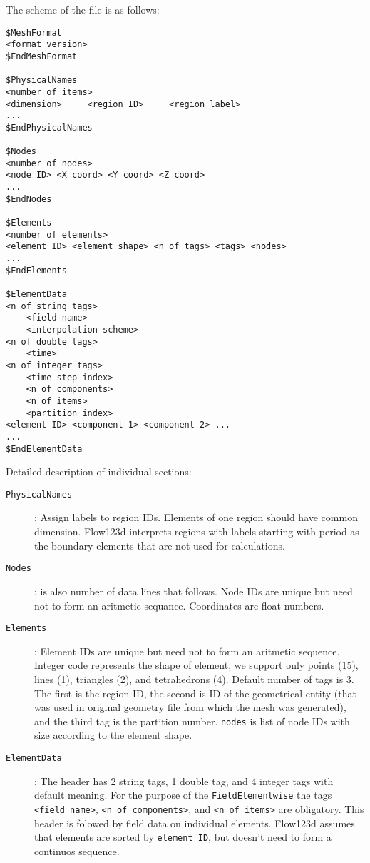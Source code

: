 The scheme of the file is as follows:
\begin{verbatim}
$MeshFormat
<format version>
$EndMeshFormat

$PhysicalNames
<number of items>
<dimension>     <region ID>     <region label>
...
$EndPhysicalNames

$Nodes
<number of nodes>
<node ID> <X coord> <Y coord> <Z coord>
...
$EndNodes

$Elements
<number of elements>
<element ID> <element shape> <n of tags> <tags> <nodes>
...
$EndElements

$ElementData
<n of string tags>
    <field name>
    <interpolation scheme>
<n of double tags>
    <time>
<n of integer tags>
    <time step index>
    <n of components>
    <n of items>
    <partition index>
<element ID> <component 1> <component 2> ...
...
$EndElementData
\end{verbatim}
Detailed description of individual sections:
\begin{description}
 \item[{\tt PhysicalNames}] : Assign labels to region IDs. Elements of one region should have common dimension. 
    Flow123d interprets regions with labels starting with period as the boundary elements that are not used for calculations.
 \item[{\tt Nodes}] : {\tt <number of nodes>} is also number of data lines that follows. 
    Node IDs are unique but need not to form an aritmetic sequance. Coordinates are float numbers.
 \item[{\tt Elements}] : Element IDs are unique but need not to form an aritmetic sequence. 
    Integer code {\tt <element shape>} represents the shape of element, we support only points (15), lines (1), triangles (2), and tetrahedrons (4).
    Default number of tags is 3. The first is the region ID, the second is ID of the geometrical entity (that was used in original geometry file from which the mesh was generated),
    and the third tag is the partition number. {\tt nodes} is list of node IDs with size according to the element shape.
 \item[{\tt ElementData}] : The header has 2 string tags, 1 double tag, and 4 integer tags with default meaning. For the purpose of the \verb'FieldElementwise' the tags
    \verb'<field name>', \verb'<n of components>', and \verb'<n of items>' are obligatory. This header is folowed by field data on individual elements. 
    Flow123d assumes that elements are sorted by {\tt element ID}, but doesn't need to form a continuos sequence.
\end{description}


